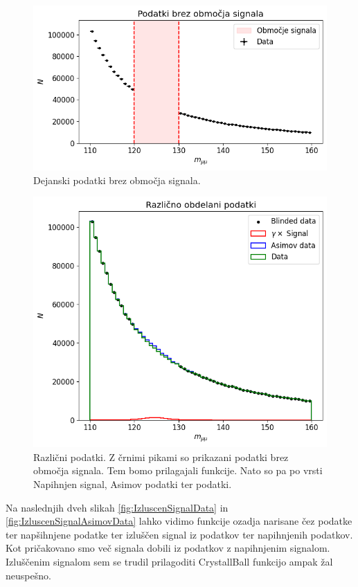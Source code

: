 \documentclass[slovene,11pt,a4paper]{article}
\begin{document}
\begin{figure}[h!]
    \centering
    \includegraphics[width=0.8\linewidth]{imgs/BrezSignala.png}
    \caption{Dejanski podatki brez območja signala.}
    \label{fig:BrezSignala}
\end{figure}

\begin{figure}[h!]
    \centering
    \includegraphics[width=0.8\linewidth]{imgs/RazlicniPodatki.png}
    \caption{Različni podatki. Z črnimi pikami so prikazani podatki brez območja signala. Tem bomo prilagajali funkcije. Nato so pa po vrsti Napihnjen signal, Asimov podatki ter podatki.}
    \label{fig:RazlicniPodatki}
\end{figure}

Na naslednjih dveh slikah \ref{fig:IzluscenSignalData} in \ref{fig:IzluscenSignalAsimovData} lahko vidimo funkcije ozadja narisane čez podatke ter napšihnjene podatke ter izluščen signal iz podatkov ter napihnjenih podatkov. Kot pričakovano smo več signala dobili iz podatkov z napihnjenim signalom. Izluščenim signalom sem se trudil prilagoditi CrystallBall funkcijo ampak žal neuspešno.
\end{document}
